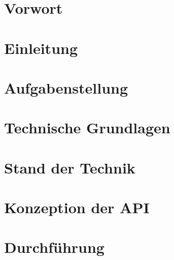 \documentclass[
	ngerman,
	a4paper,
	oneside,
	open=any
]{scrbook}
\begin{document}


\chapter*{Vorwort}


	\tableofcontents
	\printnoidxglossary[type=\acronymtype]

\chapter{Einleitung}
	
		

	
	
\chapter{Aufgabenstellung}



\chapter{Technische Grundlagen}



\chapter{Stand der Technik}



\chapter{Konzeption der API}



\chapter{Durchführung}





\end{document}
